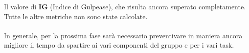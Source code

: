Il valore di \textbf{IG} (Indice di Gulpease), che risulta ancora superato completamente.\\
Tutte le altre metriche non sono state calcolate.\\\\
In generale, per la prossima fase sarà necessario preventivare in maniera ancora migliore il tempo da spartire ai vari componenti del gruppo e per i vari task.
